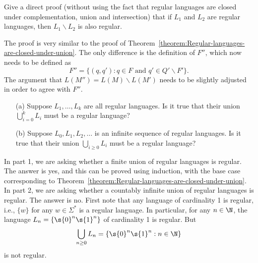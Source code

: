 \begin{flex}
\begin{exercise} \label{exercise:Direct-proof-that-regular-languages-are-closed-under-difference}
Give a direct proof (without using the fact that regular languages are closed under complementation, union and intersection) that if $L_1$ and $L_2$ are regular languages, then $L_1 \backslash L_2$ is also regular.
\end{exercise}

\begin{solution}
The proof is very similar to the proof of Theorem~\ref{theorem:Regular-languages-are-closed-under-union}. The only difference is the definition of $F''$, which now needs to be defined as
\[
F'' = \{(q, q') : q \in F \text{ and } q' \in Q' \backslash F'\}.
\]
The argument that $L(M'') = L(M) \backslash L(M')$ needs to be slightly adjusted in order to agree with $F''$.
\end{solution}
\end{flex}



% 

\begin{flex}
\begin{exercise} \label{exercise:Finite-vs-infinite-union}
\begin{enumerate}
    \item[(a)] Suppose $L_1, \ldots, L_k$ are all regular languages. 
    Is it true that their union $\bigcup_{i=0}^k L_i$ must be a regular language?      
    \item[(b)] Suppose $L_0, L_1, L_2, \ldots$ is an infinite sequence of regular languages. 
    Is it true that their union $\bigcup_{i\geq 0} L_i$ must be a regular language?
\end{enumerate}
\end{exercise}


\begin{solution}
In part 1, we are asking whether a finite union of regular languages is regular. The answer is yes, and this can be proved using induction, with the base case corresponding to Theorem~\ref{theorem:Regular-languages-are-closed-under-union}. In part 2, we are asking whether a countably infinite union of regular languages is regular. The answer is no. First note that any language of cardinality 1 is regular, i.e., $\{w\}$ for any $w \in \Sigma^*$ is a regular language. In particular, for any $n \in \N$, the language $L_n = \{\s{0}^n\s{1}^n\}$ of cardinality 1 is regular. But
\[
\bigcup_{n\geq 0} L_n = \{\s{0}^n\s{1}^n : n \in \N\}
\]
is not regular.
\end{solution}
\end{flex}


